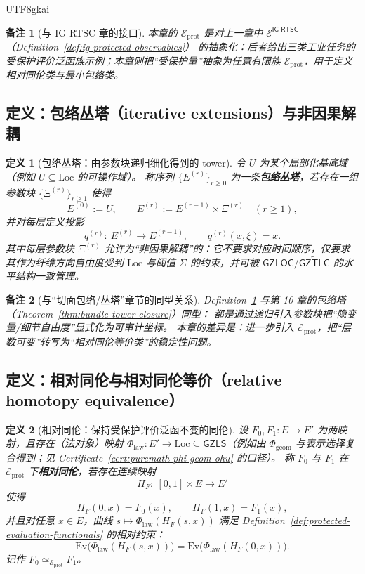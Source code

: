 \documentclass[12pt]{article}
\newtheorem{definition}{定义}[section]
\newtheorem{remark}{备注}[section]
\newcommand{\GZLS}{\ensuremath{\mathsf{GZLS}}}
\newcommand{\GZLOC}{\ensuremath{\mathsf{GZLOC}}}
\newcommand{\GZTLC}{\ensuremath{\mathsf{GZTLC}}}
\begin{document}
\begin{CJK*}{UTF8}{gkai}
\begin{remark}[与 \textsf{IG-RTSC} 章的接口]
本章的 $\mathcal{E}_{\mathrm{prot}}$ 是对上一章中 $\mathcal{E}^{\textsf{IG-RTSC}}$（Definition~\ref{def:ig-protected-observables}）
  的抽象化：后者给出三类工业任务的受保护评价泛函族示例；本章则把“受保护量”抽象为任意有限族 $\mathcal{E}_{\mathrm{prot}}$，用于定义相对同伦类与最小包络类。
\end{remark}

\subsection{定义：包络丛塔（iterative extensions）与非因果解耦}

\begin{definition}[包络丛塔：由参数块递归细化得到的 tower]
\label{def:envelope-tower-iterative}
令 $U$ 为某个局部化基底域（例如 $U\subseteq \mathrm{Loc}$ 的可操作域）。
称序列 $\{E^{(r)}\}_{r\ge 0}$ 为一条\textbf{包络丛塔}，若存在一组参数块 $\{\Xi^{(r)}\}_{r\ge 1}$ 使得
\[
E^{(0)}:=U,
\qquad
E^{(r)}:=E^{(r-1)}\times \Xi^{(r)}\quad (r\ge 1),
\]
并对每层定义投影
\[
q^{(r)}:\ E^{(r)}\to E^{(r-1)},
\qquad
q^{(r)}(x,\xi)=x.
\]
其中每层参数块 $\Xi^{(r)}$ 允许为“非因果解耦”的：它不要求对应时间顺序，仅要求其作为纤维方向自由度受到 $\mathrm{Loc}$ 与阈值 $\Sigma$ 的约束，并可被 $\GZLOC/\widetilde{\GZTLC}
  $ 的水平结构一致管理。
\end{definition}

\begin{remark}[与“切面包络/丛塔”章节的同型关系]
Definition~\ref{def:envelope-tower-iterative} 与第 10 章的包络塔（Theorem~\ref{thm:bundle-tower-closure}）同型：
  都是通过递归引入参数块把“隐变量/细节自由度”显式化为可审计坐标。
本章的差异是：进一步引入 $\mathcal{E}_{\mathrm{prot}}$，把“层数可变”转写为“相对同伦等价类”的稳定性问题。
\end{remark}

\subsection{定义：相对同伦与相对同伦等价（relative homotopy equivalence）}

\begin{definition}[相对同伦：保持受保护评价泛函不变的同伦]
\label{def:relative-homotopy}
设 $F_0,F_1:E\to E'$ 为两映射，且存在（法对象）映射 $\Phi_{\mathrm{law}}:E'\to \mathrm{Loc}\subseteq\GZLS$（例如由 $\Phi_{\mathrm{geom}}$
  与表示选择复合得到；见 Certificate~\ref{cert:puremath-phi-geom-ohu} 的口径）。
称 $F_0$ 与 $F_1$ 在 $\mathcal{E}_{\mathrm{prot}}$ 下\textbf{相对同伦}，若存在连续映射
\[
H_F:\ [0,1]\times E\to E'
\]
使得
\[
H_F(0,x)=F_0(x),\qquad H_F(1,x)=F_1(x),
\]
并且对任意 $x\in E$，曲线 $s\mapsto \Phi_{\mathrm{law}}(H_F(s,x))$ 满足 Definition~\ref{def:protected-evaluation-functionals}
  的相对约束：
\[
\mathrm{Ev}\bigl(\Phi_{\mathrm{law}}(H_F(s,x))\bigr)
=
\mathrm{Ev}\bigl(\Phi_{\mathrm{law}}(H_F(0,x))\bigr).
\]
记作 $F_0\simeq_{\mathcal{E}_{\mathrm{prot}}}F_1$。
\end{definition}


\end{CJK*}
\end{document}
